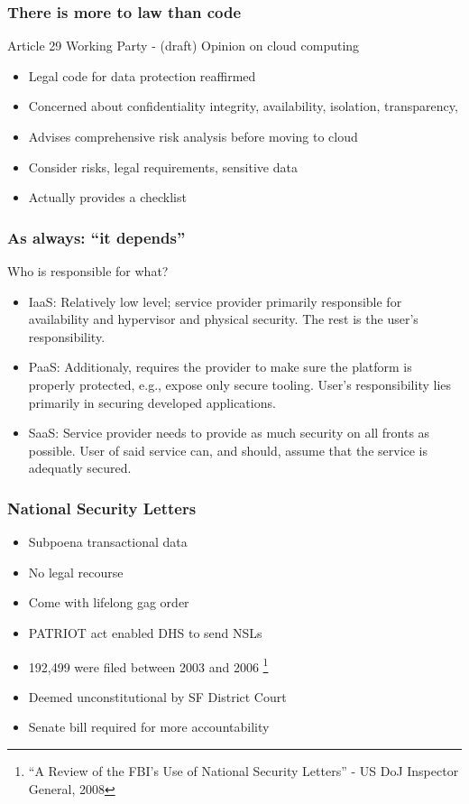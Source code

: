 \documentclass{beamer}
\begin{document}
\begin{frame}
    \frametitle{There is more to law than code}
    Article 29 Working Party - (draft) Opinion on cloud computing
    \begin{itemize}
    \item Legal code for data protection reaffirmed
    \item Concerned about confidentiality integrity, availability, isolation, transparency, 
    \item Advises comprehensive risk analysis before moving to cloud
    \item Consider risks, legal requirements, sensitive data
    \item Actually provides a checklist
    \end{itemize}
\end{frame}

\begin{frame}
    \frametitle{As always: ``it depends''}
    Who is responsible for what?
    \begin{itemize}
        \item IaaS:
            Relatively low level; service provider primarily responsible for availability
            and hypervisor and physical security. The rest is the user's
            responsibility.
        \item PaaS:
            Additionaly, requires the provider to make sure the platform is
            properly protected, e.g., expose only secure tooling. User's
            responsibility lies primarily in securing developed applications.
        \item SaaS:
            Service provider needs to provide as much security on all fronts as
            possible. User of said service can, and should, assume that the
            service is adequatly secured.
    \end{itemize}
\end{frame}

\begin{frame}
    \frametitle{National Security Letters}
    \begin{itemize}
    \item Subpoena transactional data
    \item No legal recourse
    \item Come with lifelong gag order
    \item PATRIOT act enabled DHS to send NSLs
    \item 192,499 were filed between 2003 and 2006 \footnote{``A Review of the FBI's Use of National Security Letters'' - US DoJ Inspector General, 2008}
    \item Deemed unconstitutional by SF District Court
    \item Senate bill required for more accountability
    \end{itemize}
\end{frame}
\end{document}
